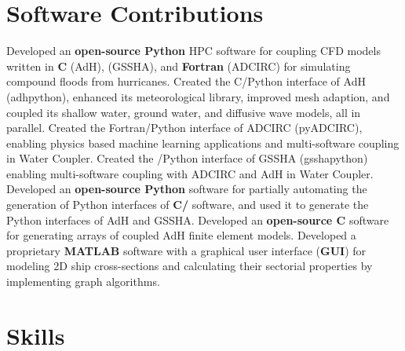 \documentclass[letterpaper,10pt]{article}
\begin{document}
\section{Software Contributions}
  \resumeSubItemListStart
      {Developed an \textbf{open-source Python} HPC software for coupling
      CFD models written in \textbf{C} (AdH),
      \textbf{\CC{}} (GSSHA), and \textbf{Fortran} (ADCIRC) for simulating
      compound floods from hurricanes.}
      {Created the C/Python interface of AdH (adhpython), enhanced its meteorological library,
      improved mesh adaption, and coupled its shallow water, ground
      water, and diffusive wave models, all in parallel.}
      {Created the Fortran/Python interface of ADCIRC (pyADCIRC), enabling physics
      based machine learning applications and multi-software coupling in Water
      Coupler.}
      {Created the \CC{}/Python interface of GSSHA (gsshapython) enabling
      multi-software coupling with ADCIRC and AdH in Water Coupler.}
      {Developed an \textbf{open-source Python} software for partially
      automating the generation of Python interfaces of \textbf{C/\CC{}}
      software, and used it to generate the Python interfaces of AdH and GSSHA.}
      {Developed an \textbf{open-source C} software for generating arrays of
      coupled AdH finite element models.}
      {Developed a proprietary \textbf{MATLAB} software with a graphical user
      interface (\textbf{GUI}) for modeling 2D ship cross-sections and
      calculating their sectorial properties by implementing graph algorithms.}
  \resumeSubItemListEnd
\vspace{-5pt}

\section{Skills}
  \resumeSubHeadingListStart
\end{document}
